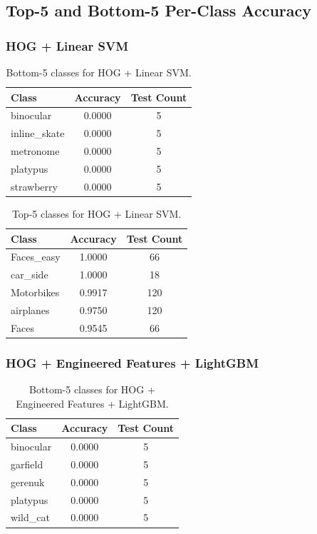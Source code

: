 \documentclass[11pt]{article}
\begin{document}
\subsection{Top-5 and Bottom-5 Per-Class Accuracy}

\subsubsection{HOG + Linear SVM}
\begin{table}[H]
\centering
\caption{Bottom-5 classes for HOG + Linear SVM.}
\begin{tabular}{lcc}
\toprule
Class & Accuracy & Test Count \\
\midrule
binocular & 0.0000 & 5 \\
inline\_skate & 0.0000 & 5 \\
metronome & 0.0000 & 5 \\
platypus & 0.0000 & 5 \\
strawberry & 0.0000 & 5 \\
\bottomrule
\end{tabular}
\end{table}

\begin{table}[H]
\centering
\caption{Top-5 classes for HOG + Linear SVM.}
\begin{tabular}{lcc}
\toprule
Class & Accuracy & Test Count \\
\midrule
Faces\_easy & 1.0000 & 66 \\
car\_side & 1.0000 & 18 \\
Motorbikes & 0.9917 & 120 \\
airplanes & 0.9750 & 120 \\
Faces & 0.9545 & 66 \\
\bottomrule
\end{tabular}
\end{table}

\subsubsection{HOG + Engineered Features + LightGBM}
\begin{table}[H]
\centering
\caption{Bottom-5 classes for HOG + Engineered Features + LightGBM.}
\begin{tabular}{lcc}
\toprule
Class & Accuracy & Test Count \\
\midrule
binocular & 0.0000 & 5 \\
garfield & 0.0000 & 5 \\
gerenuk & 0.0000 & 5 \\
platypus & 0.0000 & 5 \\
wild\_cat & 0.0000 & 5 \\
\bottomrule
\end{tabular}
\end{table}
\end{document}
